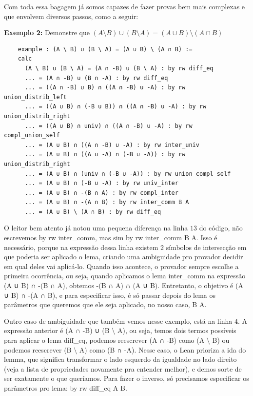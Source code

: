   Com toda essa bagagem já somos capazes de fazer provas bem mais complexas e que envolvem diversos passos, como a seguir:

  \textbf{Exemplo 2:} Demonstre que $(A \setminus B) \cup (B \setminus A) = (A \cup B) \setminus (A \cap B)$
  \begin{lstlisting}
    example : (A \ B) ∪ (B \ A) = (A ∪ B) \ (A ∩ B) :=
    calc
      (A \ B) ∪ (B \ A) = (A ∩ -B) ∪ (B \ A) : by rw diff_eq
      ... = (A ∩ -B) ∪ (B ∩ -A) : by rw diff_eq
      ... = ((A ∩ -B) ∪ B) ∩ ((A ∩ -B) ∪ -A) : by rw union_distrib_left
      ... = ((A ∪ B) ∩ (-B ∪ B)) ∩ ((A ∩ -B) ∪ -A) : by rw union_distrib_right
      ... = ((A ∪ B) ∩ univ) ∩ ((A ∩ -B) ∪ -A) : by rw compl_union_self
      ... = (A ∪ B) ∩ ((A ∩ -B) ∪ -A) : by rw inter_univ
      ... = (A ∪ B) ∩ ((A ∪ -A) ∩ (-B ∪ -A)) : by rw union_distrib_right
      ... = (A ∪ B) ∩ (univ ∩ (-B ∪ -A)) : by rw union_compl_self
      ... = (A ∪ B) ∩ (-B ∪ -A) : by rw univ_inter
      ... = (A ∪ B) ∩ -(B ∩ A) : by rw compl_inter
      ... = (A ∪ B) ∩ -(A ∩ B) : by rw inter_comm B A
      ... = (A ∪ B) \ (A ∩ B) : by rw diff_eq \end{lstlisting}

  O leitor bem atento já notou uma pequena diferença na linha $13$ do código, não escrevemos {\selectfont by rw inter\_comm}, mas sim {\selectfont by rw inter\_comm B A}. Isso é necessário, porque na expressão dessa linha existem $2$ símbolos de intersecção em que poderia ser aplicado o lema, criando uma ambiguidade pro provador decidir em qual deles vai aplicá-lo. Quando isso acontece, o provador sempre escolhe a primeira ocorrência, ou seja, quando aplicamos o lema {\selectfont inter\_comm} na expressão {\selectfont (A ∪ B) ∩ -(B ∩ A)}, obtemos {\selectfont -(B ∩ A) ∩ (A ∪ B)}. Entretanto, o objetivo é {\selectfont (A ∪ B) ∩ -(A ∩ B)}, e para especificar isso, é só passar depois do lema os parâmetros que queremos que ele seja aplicado, no nosso caso, {\selectfont B A}.

  Outro caso de ambiguidade que também vemos nesse exemplo, está na linha $4$. A expressão anterior é {\selectfont (A ∩ -B) ∪ (B $\setminus$ A)}, ou seja, temos dois termos possíveis para aplicar o lema {\selectfont diff\_eq}, podemos reescrever {\selectfont (A ∩ -B)} como {\selectfont (A $\setminus$ B)} ou podemos reescrever  {\selectfont (B $\setminus$ A)} como {\selectfont (B ∩ -A)}. Nesse caso, o Lean prioriza a ida do lemma, que significa transformar o lado esquerdo da igualdade no lado direito (veja a lista de propriedades novamente pra entender melhor), e demos sorte de ser exatamente o que queríamos. Para fazer o inverso, só precisamos especificar os parâmetros pro lema: {\selectfont by rw diff\_eq A B}.

